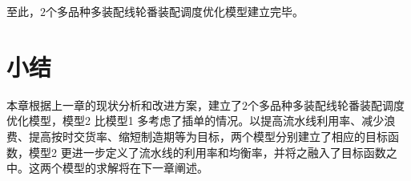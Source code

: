 至此，$2$个多品种多装配线轮番装配调度优化模型建立完毕。
\section{小结}
本章根据上一章的现状分析和改进方案，建立了$2$个多品种多装配线轮番装配调度优化模型，模型2 比模型1 多考虑了插单的情况。以提高流水线利用率、减少浪费、提高按时交货率、缩短制造期等为目标，两个模型分别建立了相应的目标函数，模型2 更进一步定义了流水线的利用率和均衡率，并将之融入了目标函数之中。这两个模型的求解将在下一章阐述。